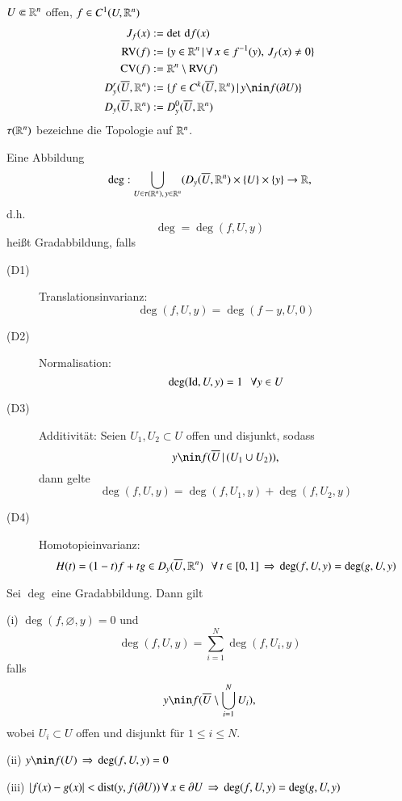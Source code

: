 $U\Subset \mathbb{R}^n$ offen, $f\in C^1(U,\mathbb{R}^n)$
\begin{align*}
    J_f(x)&:=\det \d f(x)\\
    \RV(f)&:=\{ y\in \R^n \,| \, \forall \, x\in f^{-1}(y), \, J_f(x)\neq 0 \}\\
    \CV(f)&:= \R^n \setminus \RV(f)\\
    D_y^r(\ol U, \R^n)&:=\{f\in C^k(\ol U, \R^n)\,|\,y\nin f(\partial U)\}\\
    D_y(\ol U, \R^n)&:=D_y^0(\ol U, \R^n)
\end{align*}
$\tau(\mathbb{R}^n)$ bezeichne die Topologie auf $\mathbb{R}^n$.
\begin{defi}
    Eine Abbildung
    \[
        \deg: \bigcup_{U\in \tau(\mathbb{R}^n),\, y\in \mathbb{R}^n} (D_y(\overline U, \mathbb{R}^n)\times \{U\}\times \{y\}\rightarrow \mathbb{R},
    \]
    d.h.
    \[
        \deg=\deg(f,U,y) 
    \]
    heißt Gradabbildung, falls
    \begin{description}
        \item[(D1)]
        Translationsinvarianz: 
        \[
            \deg(f,U,y)=\deg(f-y,U,0)
        \]
        \item[(D2)]
        Normalisation:
        \[
            \deg(\mathrm{Id},U,y)=1 \hspace{.25cm} \forall y\in U
        \]
        \item[(D3)]
        Additivität: Seien $U_1,U_2\subset U$ offen und disjunkt, sodass
        \[
            y\nin f(\ol U\,|\,(U_1\cup U_2)),
        \]
        dann gelte
        \[
            \deg(f,U,y)=\deg(f,U_1,y)+\deg(f,U_2,y)
        \]
        \item[(D4)]
        Homotopieinvarianz: 
        \[
            H(t)=(1-t)f+tg \in D_y(\overline U,\mathbb{R}^n) \hspace{.25cm} \forall \, t\in [0,1]\, \Rightarrow \, \deg(f,U,y)=\deg(g,U,y)
        \]
\end{description}
\end{defi}

\begin{theorem}\label{2.1}
    Sei $\deg$ eine Gradabbildung. Dann gilt
    \begin{description}
        \item{(i)}
        $\deg(f,\varnothing,y)=0$ und
        \[
            \deg(f,U,y)=\sum_{i=1}^N \deg(f,U_i,y)
        \]
        falls 
        \[
            y\nin f(\ol U\setminus\bigcup_{i=1}^NU_i),
        \]
        wobei $U_i\subset U$ offen und disjunkt für $1\leq i \leq N$.
        \item{(ii)}
        $y\nin f(U) \, \Ra \, \deg(f,U,y)=0$
        \item{(iii)}
        $|f(x)-g(x)|<\mathrm{dist}(y,f(\partial U)) \, \forall \, x\in \partial U \, \Rightarrow \, \deg(f,U,y)
        =\deg(g,U,y)$
    \end{description}
\end{theorem}

